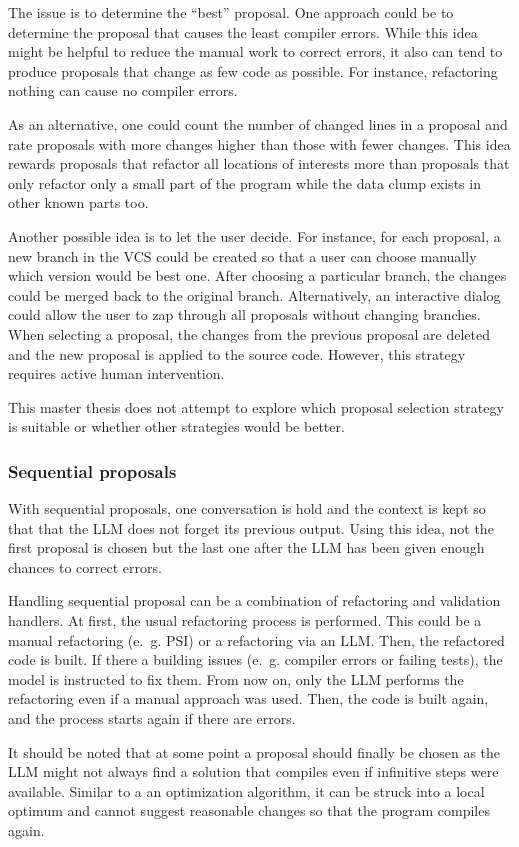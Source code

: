 The issue is to determine the \enquote{best} proposal. One approach could be to determine the proposal that causes the least compiler errors. While this idea might be helpful to reduce the manual work to correct errors, it also can tend to produce proposals that change as few code as possible. For instance, refactoring nothing can cause no compiler errors.

As an alternative, one could count the number of changed lines in a proposal and rate proposals with more changes higher than those with fewer changes. This idea rewards proposals that refactor all locations of interests more than proposals that only refactor only a small part of the program while the data clump exists in other known parts too. 


Another possible idea is to let the user decide. For instance, for each proposal, a new branch in the \ac{VCS} could be created so that a user can choose manually which version would be best one. After choosing a particular branch, the changes could be merged back to the original branch. Alternatively, an interactive dialog  could allow the user to zap through all proposals without changing branches. When selecting a proposal, the changes from the previous proposal are deleted and the new proposal is applied to the source code. However, this strategy requires active human intervention. 

This master thesis does not attempt to explore which proposal selection strategy is suitable or whether other strategies would be better. 

\subsubsection{Sequential proposals}

With sequential proposals, one conversation is hold and the context is kept so that that the \ac{LLM} does not forget its previous output. Using this idea, not the first proposal is chosen but the last one after the \ac{LLM} has been given enough chances to correct errors.

Handling sequential proposal can be a combination of refactoring and validation handlers. At first, the usual refactoring process is performed. This could be a manual refactoring (e.~g. PSI) or a refactoring via an \ac{LLM}. Then, the refactored code is built. If there a building issues (e.~g. compiler errors or failing tests), the model is instructed to fix them. From now on, only the \ac{LLM} performs the refactoring even if a manual approach was used. Then, the code is built again, and the process starts again if there are errors. 



It should be noted that at some point a proposal should finally be chosen as the \ac{LLM} might not always find a solution that compiles even if infinitive steps were available. Similar to a an optimization algorithm, it can be struck into a local optimum and cannot suggest reasonable changes so that the program compiles again.  